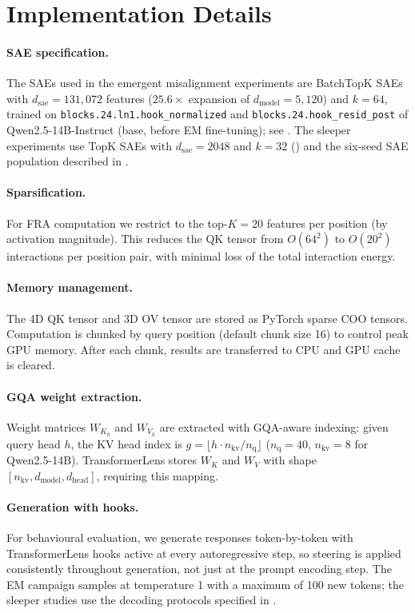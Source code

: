 \documentclass{article}
\theoremstyle{plain}
\theoremstyle{definition}
\theoremstyle{remark}
\newcommand{\WK}{W_K}
\newcommand{\WV}{W_V}
\newcommand{\dmodel}{d_{\mathrm{model}}}
\newcommand{\dhead}{d_{\mathrm{head}}}
\newcommand{\dsae}{d_{\mathrm{sae}}}
\begin{document}
\section{Implementation Details}
\label{app:implementation}

\paragraph{SAE specification.} The SAEs used in the emergent misalignment experiments are BatchTopK SAEs with $\dsae = 131{,}072$ features ($25.6\times$ expansion of $\dmodel = 5{,}120$) and $k = 64$, trained on \texttt{blocks.24.ln1.hook\_normalized} and \texttt{blocks.24.hook\_resid\_post} of Qwen2.5-14B-Instruct (base, before EM fine-tuning); see . The sleeper experiments use TopK SAEs with $\dsae = 2048$ and $k = 32$ () and the six-seed SAE population described in .

\paragraph{Sparsification.} For FRA computation we restrict to the top-$K{=}20$ features per position (by activation magnitude). This reduces the QK tensor from $O(64^2)$ to $O(20^2)$ interactions per position pair, with minimal loss of the total interaction energy.

\paragraph{Memory management.} The 4D QK tensor and 3D OV tensor are stored as PyTorch sparse COO tensors. Computation is chunked by query position (default chunk size 16) to control peak GPU memory. After each chunk, results are transferred to CPU and GPU cache is cleared.

\paragraph{GQA weight extraction.} Weight matrices $W_{K_h}$ and $W_{V_h}$ are extracted with GQA-aware indexing: given query head $h$, the KV head index is $g = \lfloor h \cdot n_{\mathrm{kv}} / n_{\mathrm{q}} \rfloor$ ($n_{\mathrm{q}} = 40$, $n_{\mathrm{kv}} = 8$ for Qwen2.5-14B). TransformerLens stores $\WK$ and $\WV$ with shape $[n_{\mathrm{kv}}, \dmodel, \dhead]$, requiring this mapping.

\paragraph{Generation with hooks.} For behavioural evaluation, we generate responses token-by-token with TransformerLens hooks active at every autoregressive step, so steering is applied consistently throughout generation, not just at the prompt encoding step. The EM campaign samples at temperature 1 with a maximum of 100 new tokens; the sleeper studies use the decoding protocols specified in .
\end{document}
